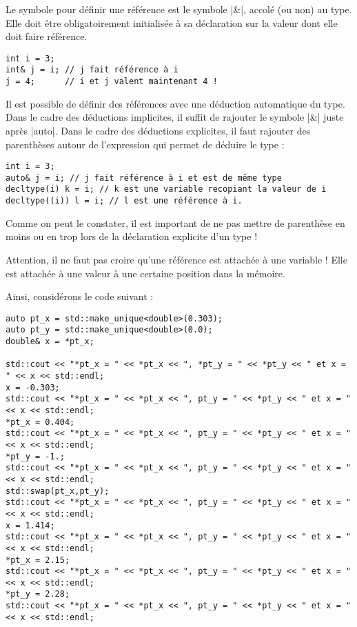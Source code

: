 Le symbole pour définir une référence est le symbole |&|, accolé (ou non) au type. Elle doit être obligatoirement initialisée à sa déclaration sur la valeur dont elle doit faire référence.

\begin{lstlisting}
int i = 3;
int& j = i; // j fait référence à i
j = 4;      // i et j valent maintenant 4 !
\end{lstlisting}

Il est possible de définir des références avec une déduction automatique du type.
Dans le cadre des déductions implicites, il suffit de rajouter le symbole |&| juste après |auto|.
Dans le cadre des déductions explicites, il faut rajouter des parenthèses autour de l'expression
qui permet de déduire le type :

\begin{lstlisting}[caption=Exemple de référence avec déduction de type automatique]
int i = 3;
auto& j = i; // j fait référence à i et est de même type
decltype(i) k = i; // k est une variable recopiant la valeur de i
decltype((i)) l = i; // l est une référence à i.
\end{lstlisting}

Comme on peut le constater, il est important de ne pas mettre de parenthèse en moins ou en trop
lors de la déclaration explicite d'un type ! 

Attention, il ne faut pas croire qu'une référence est attachée à une variable ! Elle est attachée à une valeur à une certaine
position dans la mémoire.

Ainsi, considérons le code suivant :
\begin{lstlisting}
auto pt_x = std::make_unique<double>(0.303);
auto pt_y = std::make_unique<double>(0.0);
double& x = *pt_x;

std::cout << "*pt_x = " << *pt_x << ", *pt_y = " << *pt_y << " et x = " << x << std::endl;
x = -0.303;
std::cout << "*pt_x = " << *pt_x << ", pt_y = " << *pt_y << " et x = " << x << std::endl;
*pt_x = 0.404;
std::cout << "*pt_x = " << *pt_x << ", pt_y = " << *pt_y << " et x = " << x << std::endl;
*pt_y = -1.;
std::cout << "*pt_x = " << *pt_x << ", pt_y = " << *pt_y << " et x = " << x << std::endl;
std::swap(pt_x,pt_y);
std::cout << "*pt_x = " << *pt_x << ", pt_y = " << *pt_y << " et x = " << x << std::endl;
x = 1.414;
std::cout << "*pt_x = " << *pt_x << ", pt_y = " << *pt_y << " et x = " << x << std::endl;
*pt_x = 2.15;
std::cout << "*pt_x = " << *pt_x << ", pt_y = " << *pt_y << " et x = " << x << std::endl;
*pt_y = 2.28;
std::cout << "*pt_x = " << *pt_x << ", pt_y = " << *pt_y << " et x = " << x << std::endl;
\end{lstlisting}

